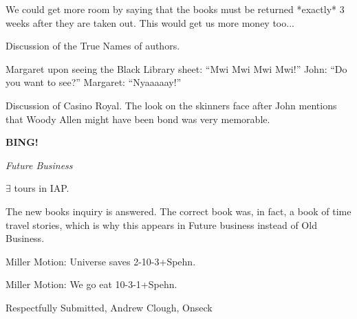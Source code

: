 \documentclass[12pt]{article}
\newcommand{\bing}{{\bf BING!} }
\newcommand{\goto}[1]{\bing \vskip 12pt \centerline{{\em{#1}}}}
\begin{document}
We could get more room by saying that the books must be returned *exactly* 3 weeks after they are taken out.  This would get us more money too...

Discussion of the True Names of authors.

Margaret upon seeing the Black Library sheet:  ``Mwi Mwi Mwi Mwi!''
John:  ``Do you want to see?''
Margaret:  ``Nyaaaaay!''

Discussion of Casino Royal.  The look on the skinners face after John mentions that Woody Allen might have been bond was very memorable.

\goto{Future Business}

$ \exists $ tours in IAP.

The new books inquiry is answered.  The correct book was, in fact, a book of time travel stories, which is why this appears in Future business instead of Old Business.

Miller Motion: Universe saves 2-10-3+Spehn.

Miller Motion: We go eat 10-3-1+Spehn.

\vspace{18pt}
\begin{center}

Respectfully Submitted,
Andrew Clough, Onseck

\end{center}
\end{document}
